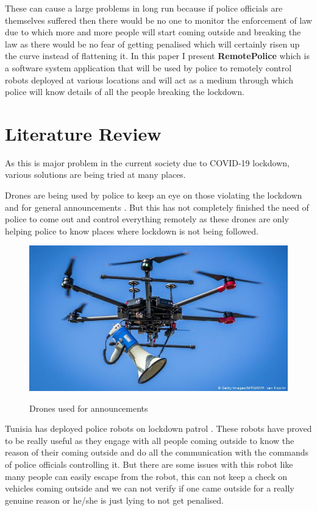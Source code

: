 \documentclass[10pt,twocolumn,letterpaper]{article}
\begin{document}
These can cause a large problems in long run because if police officials are themselves suffered then there would be no one to monitor the enforcement of law due to which more and more people will start coming outside and breaking the law as there would be no fear of getting penalised which will certainly risen up the curve instead of flattening it.
In this paper I present \textbf{RemotePolice} which is a software system application that will be used by police to remotely control robots deployed at various locations and will act as a medium through which police will know details of all the people breaking the lockdown.

\section{Literature Review}
As this is major problem in the current society due to COVID-19 lockdown, various solutions are being tried at many places.

Drones are being used by police to keep an eye on those violating the lockdown and for general announcements \cite{drones}. But this has not completely finished the need of police to come out and control everything remotely as these drones are only helping police to know places where lockdown is not being followed.

\begin{figure}[!htb]
	\centering\includegraphics[width=\columnwidth]{drones.jpg}\\
	\caption{Drones used for announcements}\label{drones}
\end{figure}

Tunisia has deployed police robots on lockdown patrol \cite{tunisia}. These robots have proved to be really useful as they engage with all people coming outside to know the reason of their coming outside and do all the communication with the commands of police officials controlling it. But there are some issues with this robot like many people can easily escape from the robot, this can not keep a check on vehicles coming outside and we can not verify if one came outside for a really genuine reason or he/she is just lying to not get penalised.
\end{document}
